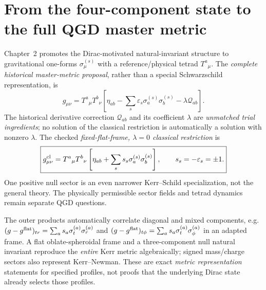 \documentclass[11pt,a4paper]{article}
\begin{document}
\section{From the four-component state to the full QGD master metric}\label{sec:geometry}
Chapter~2 promotes the Dirac-motivated natural-invariant structure to gravitational one-forms $\sigma_\mu^{(s)}$ with a reference/physical tetrad $T^a{}_{\mu}$. The \emph{complete historical master-metric proposal}, rather than a special Schwarzschild representation, is
\begin{equation}\label{eq:qgd052-full-master-ch1}
 \boxed{g_{\mu\nu}=T^a{}_{\mu}T^b{}_{\nu}
 \left[\eta_{ab}-\sum_s\varepsilon_s\sigma_a^{(s)}\sigma_b^{(s)}
 -\lambda\mathcal Q_{ab}\right].}
\end{equation}
The historical derivative correction $\mathcal Q_{ab}$ and its coefficient $\lambda$ are \emph{unmatched trial ingredients}; no solution of the classical restriction is automatically a solution with nonzero $\lambda$.  The checked \emph{fixed-flat-frame, $\lambda=0$ classical restriction} is
\begin{equation}\label{eq:qgd-full-handoff}
 \boxed{g^{\rm cl}_{\mu\nu}=T^a{}_{\mu}T^b{}_{\nu}
 \left[\eta_{ab}+\sum_s s_s\sigma_a^{(s)}\sigma_b^{(s)}\right],\qquad s_s=-\varepsilon_s=\pm1.}
\end{equation}
One positive null sector is an even narrower Kerr--Schild specialization, not the general theory.  The physically permissible sector fields and tetrad dynamics remain separate QGD questions.

The outer products automatically correlate diagonal and mixed components, e.g. $(g-g^{\rm flat})_{tr}=\sum_as_a\sigma_t^{(a)}\sigma_r^{(a)}$ and $(g-g^{\rm flat})_{t\phi}=\sum_as_a\sigma_t^{(a)}\sigma_\phi^{(a)}$ in an adapted frame. A flat oblate-spheroidal frame and a three-component null natural invariant reproduce the \emph{entire} Kerr metric algebraically; signed mass/charge sectors also represent Kerr--Newman. These are exact \emph{metric representation} statements for specified profiles, not proofs that the underlying Dirac state already selects those profiles.


\end{document}
